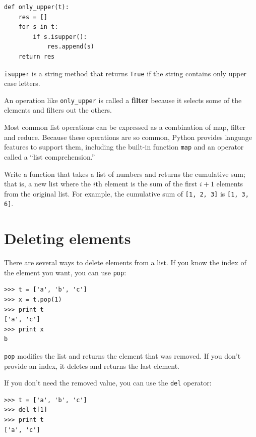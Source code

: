 \documentclass[10pt]{book}
\begin{document}
\beforeverb
\begin{verbatim}
def only_upper(t):
    res = []
    for s in t:
        if s.isupper():
            res.append(s)
    return res
\end{verbatim}
\afterverb
%
{\tt isupper} is a string method that returns {\tt True} if
the string contains only upper case letters.

An operation like \verb"only_upper" is called a {\bf filter} because
it selects some of the elements and filters out the others.

Most common list operations can be expressed as a combination
of map, filter and reduce.  Because these operations are
so common, Python provides language features to support them,
including the built-in function {\tt map} and an operator
called a ``list comprehension.''


\begin{ex}
\label{cumulative}

Write a function that takes a list of numbers and returns the
cumulative sum; that is, a new list where the $i$th element
is the sum of the first $i+1$ elements from the original list.
For example, the cumulative sum of {\tt [1, 2, 3]} is
{\tt [1, 3, 6]}. 
\end{ex}


\section{Deleting elements}


There are several ways to delete elements from a list.  If you
know the index of the element you want, you can use
{\tt pop}:


\beforeverb
\begin{verbatim}
>>> t = ['a', 'b', 'c']
>>> x = t.pop(1)
>>> print t
['a', 'c']
>>> print x
b
\end{verbatim}
\afterverb
%
{\tt pop} modifies the list and returns the element that was removed.
If you don't provide an index, it deletes and returns the
last element.

If you don't need the removed value, you can use the {\tt del}
operator:


\beforeverb
\begin{verbatim}
>>> t = ['a', 'b', 'c']
>>> del t[1]
>>> print t
['a', 'c']
\end{verbatim}
\afterverb
%
\end{document}
